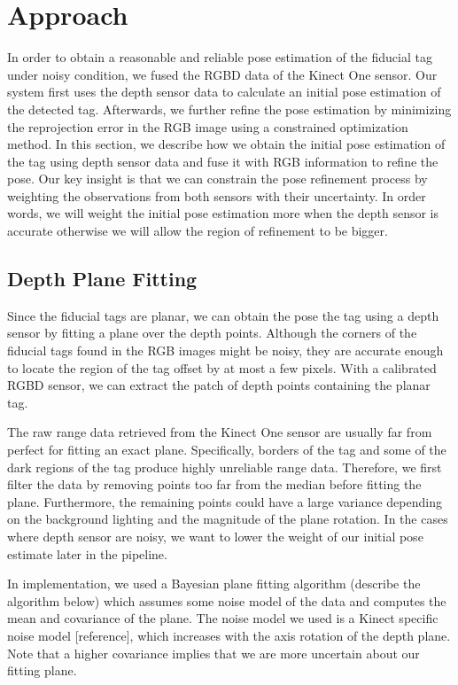 \section{Approach}
\label{sec:approach}
In order to obtain a reasonable and reliable pose estimation of the fiducial tag under noisy condition, we fused the RGBD data of the Kinect One sensor. Our system first uses the depth sensor data to calculate an initial pose estimation of the detected tag. Afterwards, we further refine the pose estimation by minimizing the reprojection error in the RGB image using a constrained optimization method. In this section, we describe how we obtain the initial pose estimation of the tag using depth sensor data and fuse it with RGB information to refine the pose. Our key insight is that we can constrain the pose refinement process by weighting the observations from both sensors with their uncertainty. In order words, we will weight the initial pose estimation more when the depth sensor is accurate otherwise we will allow the region of refinement to be bigger. 

\subsection{Depth Plane Fitting}
Since the fiducial tags are planar, we can obtain the pose the tag using a depth sensor by fitting a plane over the depth points. Although the corners of the fiducial tags found in the RGB images might be noisy, they are accurate enough to locate the region of the tag offset by at most a few pixels. With a calibrated RGBD sensor, we can extract the patch of depth points containing the planar tag. 

The raw range data retrieved from the Kinect One sensor are usually far from perfect for fitting an exact plane. Specifically, borders of the tag and some of the dark regions of the tag produce highly unreliable range data. Therefore, we first filter the data by removing points too far from the median before fitting the plane. Furthermore, the remaining points could have a large variance depending on the background lighting and the magnitude of the plane rotation. In the cases where depth sensor are noisy, we want to lower the weight of our initial pose estimate later in the pipeline. 

In implementation, we used a Bayesian plane fitting algorithm (describe the algorithm below)  which assumes some noise model of the data and computes the mean and covariance of the plane. The noise model we used is a Kinect specific noise model [reference], which increases with the axis rotation of the depth plane. Note that a higher covariance implies that we are more uncertain about our fitting plane. 

